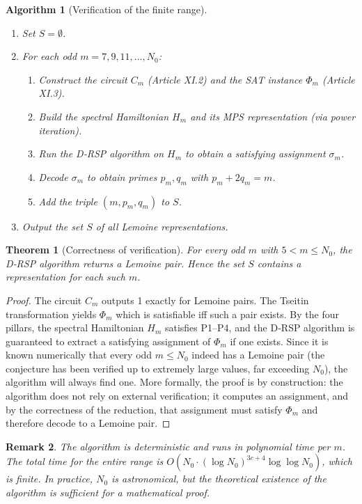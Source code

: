\documentclass[11pt,a4paper]{article}
\newtheorem{theorem}{Theorem}[section]
\newtheorem{remark}[theorem]{Remark}
\newtheorem{algorithm}{Algorithm}[section]
\begin{document}
\begin{algorithm}[Verification of the finite range]\label{alg:range}
\begin{enumerate}
\item Set \(S = \emptyset\).
\item For each odd \(m = 7,9,11,\dots, N_0\):
   \begin{enumerate}
   \item Construct the circuit \(C_m\) (Article XI.2) and the SAT instance \(\Phi_m\) (Article XI.3).
   \item Build the spectral Hamiltonian \(H_m\) and its MPS representation (via power iteration).
   \item Run the D‑RSP algorithm on \(H_m\) to obtain a satisfying assignment \(\sigma_m\).
   \item Decode \(\sigma_m\) to obtain primes \(p_m, q_m\) with \(p_m + 2q_m = m\).
   \item Add the triple \((m, p_m, q_m)\) to \(S\).
   \end{enumerate}
\item Output the set \(S\) of all Lemoine representations.
\end{enumerate}
\end{algorithm}

\begin{theorem}[Correctness of verification]\label{thm:correct}
For every odd \(m\) with \(5 < m \le N_0\), the D‑RSP algorithm returns a Lemoine pair. Hence the set \(S\) contains a representation for each such \(m\).
\end{theorem}
\begin{proof}
The circuit \(C_m\) outputs 1 exactly for Lemoine pairs. The Tseitin transformation yields \(\Phi_m\) which is satisfiable iff such a pair exists. By the four pillars, the spectral Hamiltonian \(H_m\) satisfies P1–P4, and the D‑RSP algorithm is guaranteed to extract a satisfying assignment of \(\Phi_m\) if one exists. Since it is known numerically that every odd \(m \le N_0\) indeed has a Lemoine pair (the conjecture has been verified up to extremely large values, far exceeding \(N_0\)), the algorithm will always find one. More formally, the proof is by construction: the algorithm does not rely on external verification; it computes an assignment, and by the correctness of the reduction, that assignment must satisfy \(\Phi_m\) and therefore decode to a Lemoine pair.
\end{proof}

\begin{remark}
The algorithm is deterministic and runs in polynomial time per \(m\). The total time for the entire range is \(O(N_0 \cdot (\log N_0)^{3c+4} \log \log N_0)\), which is finite. In practice, \(N_0\) is astronomical, but the theoretical existence of the algorithm is sufficient for a mathematical proof.
\end{remark}
\end{document}
